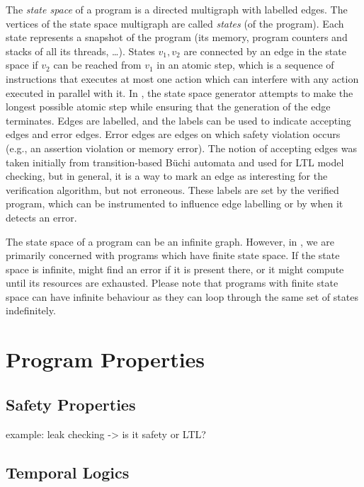 The \emph{state space} of a program is a directed multigraph with labelled edges.
The vertices of the state space multigraph are called \emph{states} (of the program).
Each state represents a snapshot of the program (its memory, program counters and stacks of all its threads, …).
States $v_1, v_2$ are connected by an edge in the state space if $v_2$ can be reached from $v_1$ in an atomic step, which is a sequence of instructions that executes at most one action which can interfere with any action executed in parallel with it.
In \divine, the state space generator attempts to make the longest possible atomic step while ensuring that the generation of the edge terminates.
Edges are labelled, and the labels can be used to indicate accepting edges and error edges.
Error edges are edges on which safety violation occurs (e.g., an assertion violation or memory error).
The notion of accepting edges was taken initially from transition-based Büchi automata and used for LTL model checking, but in general, it is a way to mark an edge as interesting for the verification algorithm, but not erroneous.
These labels are set by the verified program, which can be instrumented to influence edge labelling or by \divine when it detects an error.

The state space of a program can be an infinite graph.
However, in \divine, we are primarily concerned with programs which have finite state space.
If the state space is infinite, \divine might find an error if it is present
there, or it might compute until its resources are exhausted.
Please note that programs with finite state space can have infinite behaviour as they can loop through the same set of states indefinitely.

\section{Program Properties}

\subsection{Safety Properties}

example: leak checking -> is it safety or LTL?

\subsection{Temporal Logics}


